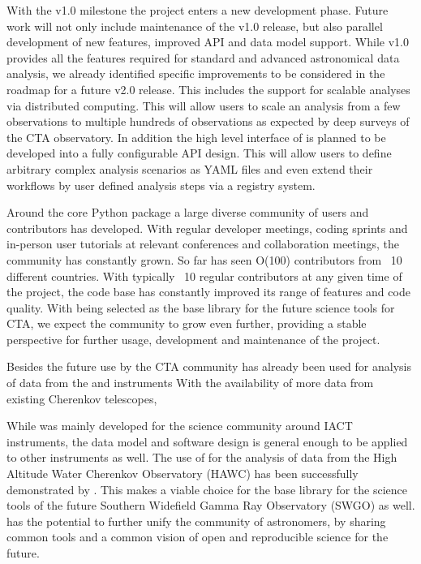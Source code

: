 With the v1.0 milestone the \gammapy project enters a new development
phase. Future work will not only include maintenance of the v1.0 release,
but also parallel development of new features, improved API and data
model support. While v1.0 provides all the features required for
standard and advanced astronomical \gammaray data analysis,
we already identified specific improvements to be considered in the
roadmap for a future v2.0 release. This includes the support for
scalable analyses via distributed computing. This will allow
users to scale an analysis from a few observations to multiple
hundreds of observations as expected by deep surveys of the CTA
observatory. In addition the high level interface
of \gammapy is planned to be developed into a fully configurable
API design. This will allow users to define arbitrary complex analysis
scenarios as YAML files and even extend their workflows by user defined
analysis steps via a registry system.

Around the core Python package a large diverse community of
users and contributors has developed. With regular developer meetings,
coding sprints and in-person user tutorials at relevant conferences
and collaboration meetings, the community has constantly grown.
So far \gammapy has seen O(100) contributors from ~10 different countries.
With typically ~10 regular contributors at any given time of the
project, the code base has constantly improved its range of features
and code quality. With \gammapy being selected as the base library
for the future science tools for CTA, we expect the community to grow
even further, providing a stable perspective for further usage,
development and maintenance of the project.

Besides the future use by the CTA community \gammapy has already
been used for analysis of data from the \hess and \magic instruments
With the availability of more \gammaray data from existing Cherenkov
telescopes, \gammaray

While \gammapy was mainly developed for the science community around
IACT instruments, the data model and software design is general
enough to be applied to other \gammaray instruments as well.
The use of \gammapy for the analysis of data from the High Altitude
Water Cherenkov Observatory (HAWC) has been successfully
demonstrated by . This makes \gammapy
a viable choice for the base library for the science tools
of the future Southern Widefield Gamma Ray Observatory
(SWGO) as well. \gammapy has the potential to further unify the community
of \gammaray astronomers, by sharing common tools and
a common vision of open and reproducible science for the future.
